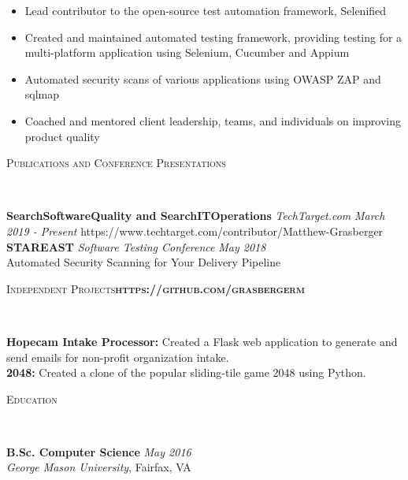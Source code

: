 \documentclass[9pt]{article}
\newenvironment{changemargin}[2]{%
  \begin{list}{}{%
    \setlength{\topsep}{0pt}%
    \setlength{\leftmargin}{#1}%
    \setlength{\rightmargin}{#2}%
    \setlength{\listparindent}{\parindent}%
    \setlength{\itemindent}{\parindent}%
    \setlength{\parsep}{\parskip}%
  }%
  \item[]}{\end{list}
}
\newcommand{\lineover}{
	\begin{changemargin}{-0.05in}{-0.05in}
		\vspace*{-8pt}
		\hrulefill \\
		\vspace*{-2pt}
	\end{changemargin}
}
\newcommand{\header}[1]{
	\begin{changemargin}{-0.5in}{-0.5in}
		\scshape{#1}\\
  	\lineover
	\end{changemargin}
}
\newenvironment{body} {
	\vspace*{-10pt}
	\begin{changemargin}{-0.25in}{-0.5in}
  }	
	{\end{changemargin}
}
\begin{document}
\begin{body}
	\vspace*{-4pt}
	\begin{itemize} \itemsep -0pt  %
		\item  Lead contributor to the open-source test automation framework, Selenified
		\item  Created and maintained automated testing framework, providing testing for a multi-platform application using Selenium, Cucumber and Appium
		\item  Automated security scans of various applications using OWASP ZAP and sqlmap
		\item  Coached and mentored client leadership, teams, and individuals on improving product quality
	\end{itemize}
\end{body}
\vspace{10pt}	
\smallskip
\header{Publications and Conference Presentations}

\begin{body}
	\vspace{14pt}
        \textbf{SearchSoftwareQuality and SearchITOperations }\emph{TechTarget.com} \hfill \emph{March 2019 - Present}{} https://www.techtarget.com/contributor/Matthew-Grasberger\\
	\smallskip
	\vspace{4pt}
	\textbf{STAREAST }\emph{Software Testing Conference} \hfill \emph{May 2018}{}\\
	Automated Security Scanning for Your Delivery Pipeline
	\vspace{4pt}
\end{body}
\vspace{10pt}
\smallskip
\header{Independent Projects\hfill \textbf{https://github.com/grasbergerm}}

\begin{body}
	\vspace{14pt}
	{\textbf{Hopecam Intake Processor:}}{} Created a Flask web application to generate and send emails for non-profit organization intake. \\
	\vspace{4pt}
	{\textbf{2048:}}{} Created a clone of the popular sliding-tile game 2048 using Python.\\
	\vspace{10pt}
\end{body}

\header{Education}

\begin{body}
	\vspace{14pt}
	\textbf{B.Sc. Computer Science }{} \hfill \emph{May 2016}\\
	\emph{George Mason University}, Fairfax, VA\\
	\vspace{4pt}
\end{body}
\smallskip
\end{document}
